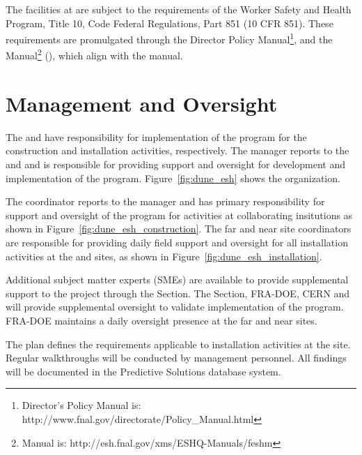 The  facilities at  are subject to
the requirements of the  Worker Safety and Health Program,
Title 10, Code Federal Regulations, Part 851 (10 CFR 851). These
requirements are promulgated through the \fnal Director Policy
Manual\footnote{\fnal Director's Policy Manual is:
  http://www.fnal.gov/directorate/Policy\_Manual.html}, and the \fnal
{} Manual\footnote{\fnal {} Manual is:
  http://esh.fnal.gov/xms/ESHQ-Manuals/feshm} (), which
align with the   manual.


\section{  Management and Oversight}

The  and  have responsibility for
implementation of the   program for the construction and installation activities, respectively.  The
  manager reports to the
 and  and is responsible for providing
 support and oversight for development and implementation of the 
  program. Figure~\ref{fig:dune_esh} shows
the   organization.


The   coordinator reports to the
  manager and has primary responsibility
for  support and oversight of the  
program for activities at collaborating insitutions as shown in
Figure~\ref{fig:dune_esh_construction}.  The far and near site
 coordinators are responsible for providing daily field support and
oversight for all installation activities at the 
and  sites, as shown in Figure~\ref{fig:dune_esh_installation}.

Additional  subject matter experts (SMEs) are available to
provide supplemental support to the project through the \fnal
{} Section. The \fnal {} Section, FRA-DOE, CERN and
 will provide supplemental  oversight to
validate implementation of the  
program. FRA-DOE maintains a daily oversight presence at the far and
near sites.

The   plan defines the 
requirements applicable to installation activities at the 
site. Regular  walkthroughs will be conducted by
  management personnel. All
findings will be documented in the \fnal Predictive Solutions
database system.

